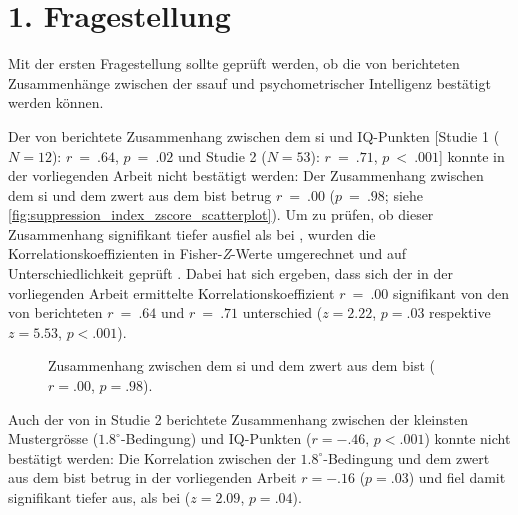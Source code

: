 \documentclass[11pt, twoside, a4paper]{book}		%
\begin{document}
\clearpage
\section{1. Fragestellung}

Mit der ersten Fragestellung sollte geprüft werden, ob die von \citet{Melnick2013} berichteten Zusammenhänge zwischen der \gls{ssauf} und psychometrischer Intelligenz bestätigt werden können. 

Der von \citet{Melnick2013} berichtete Zusammenhang zwischen dem \gls{si} und IQ-Punkten [Studie 1 ($N=12$): $r~=~.64$, $p~=~.02$ und Studie 2 ($N=53$): $r~=~.71$, $p~<~.001$] konnte in der vorliegenden Arbeit nicht bestätigt werden: Der Zusammenhang zwischen dem \gls{si} und dem \gls{zwert} aus dem \gls{bist} betrug $r~=~.00$ ($p~=~.98$; siehe \autoref{fig:suppression_index_zscore_scatterplot}). 
Um zu prüfen, ob dieser Zusammenhang signifikant tiefer ausfiel als bei \citeauthor{Melnick2013}, wurden die Korrelationskoeffizienten in Fisher-\textit{Z}-Werte umgerechnet und  auf Unterschiedlichkeit geprüft \citep[][S. 54]{Cohen1983}. 
Dabei hat sich ergeben, dass sich der in der vorliegenden Arbeit ermittelte Korrelationskoeffizient $r~=~.00$ signifikant von den von \citet{Melnick2013} berichteten $r~=~.64$ und $r~=~.71$ unterschied ($z=2.22$, $p=.03$ respektive $z=5.53$, $p<.001$).

\begin{figure}[t]
	\centering
	\begin{adjustbox}{width=1\textwidth}
		
	\end{adjustbox}
	\caption[Spatial-Index-Intelligenz-Zusammenhang]{Zusammenhang  zwischen dem \gls{si} und dem \gls{zwert} aus dem \gls{bist} ($r=.00$, $p=.98$).}
	\label{fig:suppression_index_zscore_scatterplot}
\end{figure}


Auch der von \citet{Melnick2013} in Studie 2 berichtete Zusammenhang zwischen der kleinsten Mustergrösse ($1.8^{\circ}$-Bedingung) und IQ-Punkten ($r=-.46$, $p<.001$) konnte nicht bestätigt werden: Die Korrelation zwischen der $1.8^{\circ}$-Bedingung und dem \gls{zwert} aus dem \gls{bist} betrug in der vorliegenden Arbeit $r=-.16$ ($p=.03$) und fiel damit signifikant tiefer aus, als bei \citeauthor{Melnick2013} ($z=2.09$, $p=.04$).
\end{document}
